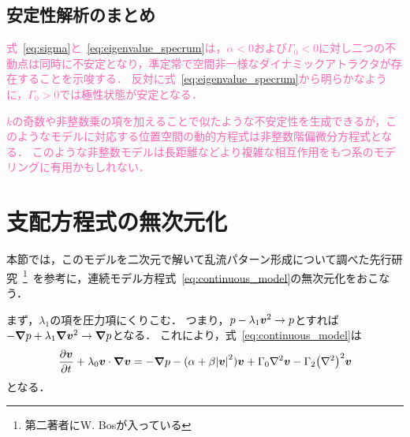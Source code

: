 \documentclass[12pt,dvipdfmx,svgnames,a4paper,uplatex]{ujarticle}
\theoremstyle{plain}
\begin{document}
\subsection{安定性解析のまとめ}
\label{subsec:summary_stability_analysis}

\textcolor{HotPink}{
式~\ref{eq:sigma}と~\ref{eq:eigenvalue_specrum}は，\(\alpha < 0\)および\(\Gamma_0 < 0\)に対し二つの不動点は同時に不安定となり，準定常で空間非一様なダイナミックアトラクタが存在することを示唆する．
反対に式~\ref{eq:eigenvalue_specrum}から明らかなように，\(\Gamma_0 > 0\)では極性状態が安定となる．
}

\textcolor{HotPink}{
\(k\)の奇数や非整数乗の項を加えることで似たような不安定性を生成できるが，このようなモデルに対応する位置空間の動的方程式は非整数階偏微分方程式となる．
このような非整数モデルは長距離などより複雑な相互作用をもつ系のモデリングに有用かもしれない．
}

\section{支配方程式の無次元化}
\label{sec:governing_equation_nondimensionalisation}

本節では，このモデルを二次元で解いて乱流パターン形成について調べた先行研究~\footnote{第二著者にW. Bosが入っている}~\cite[脚注28]{James2017}を参考に，連続モデル方程式~\ref{eq:continuous_model}の無次元化をおこなう．

まず，\(\lambda_1\)の項を圧力項にくりこむ．
つまり，\(p - \lambda_1 \vb*{v}^2 \to p\)とすれば\(-\grad{p} + \lambda_1 \grad{\vb*{v}^2} \to \grad{p}\)となる．
これにより，式~\ref{eq:continuous_model}は
\begin{equation}
  \pdv{\vb*{v}}{t} + \lambda_0 \vb*{v} \cdot \grad{\vb*{v}} = -\grad{p} - (\alpha + \beta \abs{\vb*{v}}^2) \vb*{v} + \Gamma_0 \laplacian \vb*{v} - \Gamma_2 \qty(\laplacian)^2 \vb*{v}
  \label{eq:continuous_model_absorb_lambda1}
\end{equation}
となる．
\end{document}
